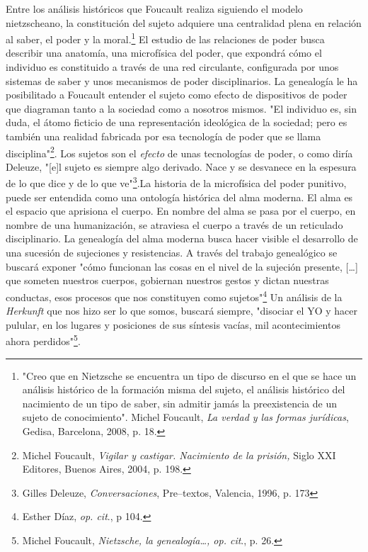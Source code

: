 \documentclass{book}
\begin{document}
Entre los análisis históricos que Foucault realiza siguiendo el modelo
nietzscheano, la constitución del sujeto adquiere una centralidad plena
en relación al saber, el poder y la moral.\footnote{"Creo que en
  Nietzsche se encuentra un tipo de discurso en el que se hace un
  análisis histórico de la formación misma del sujeto, el análisis
  histórico del nacimiento de un tipo de saber, sin admitir jamás la
  preexistencia de un sujeto de conocimiento". Michel Foucault, \emph{La
  verdad y las formas jurídicas}, Gedisa, Barcelona, 2008, p. 18.} El
estudio de las relaciones de poder busca describir una anatomía, una
microfísica del poder, que expondrá cómo el individuo es constituido a
través de una red circulante, configurada por unos sistemas de saber y
unos mecanismos de poder disciplinarios. La genealogía le ha
posibilitado a Foucault entender el sujeto como efecto de dispositivos
de poder que diagraman tanto a la sociedad como a nosotros mismos. "El
individuo es, sin duda, el átomo ficticio de una representación
ideológica de la sociedad; pero es también una realidad fabricada por
esa tecnología de poder que se llama disciplina"\footnote{Michel
  Foucault, \emph{Vigilar y castigar. Nacimiento de la prisión,} Siglo
  XXI Editores, Buenos Aires, 2004, p. 198.}. Los sujetos son el
\emph{efecto} de unas tecnologías de poder, o como diría Deleuze,
"{[}e{]}l sujeto es siempre algo derivado. Nace y se desvanece en la
espesura de lo que dice y de lo que ve"\footnote{Gilles Deleuze,
  \emph{Conversaciones}, Pre--textos, Valencia, 1996, p. 173}.La
historia de la microfísica del poder punitivo, puede ser entendida como
una ontología histórica del alma moderna. El alma es el espacio que
aprisiona el cuerpo. En nombre del alma se pasa por el cuerpo, en nombre
de una humanización, se atraviesa el cuerpo a través de un reticulado
disciplinario. La genealogía del alma moderna busca hacer visible el
desarrollo de una sucesión de sujeciones y resistencias. A través del
trabajo genealógico se buscará exponer "cómo funcionan las cosas en el
nivel de la sujeción presente, {[}\ldots{]} que someten nuestros
cuerpos, gobiernan nuestros gestos y dictan nuestras conductas, esos
procesos que nos constituyen como sujetos"\footnote{Esther Díaz,
  \emph{op. cit}., p 104.} Un análisis de la \emph{Herkunft} que nos
hizo ser lo que somos, buscará siempre, "disociar el YO y hacer pulular,
en los lugares y posiciones de sus síntesis vacías, mil acontecimientos
ahora perdidos"\footnote{Michel Foucault, \emph{Nietzsche, la
  genealogía\ldots, op. cit}., p. 26.}.
\end{document}
